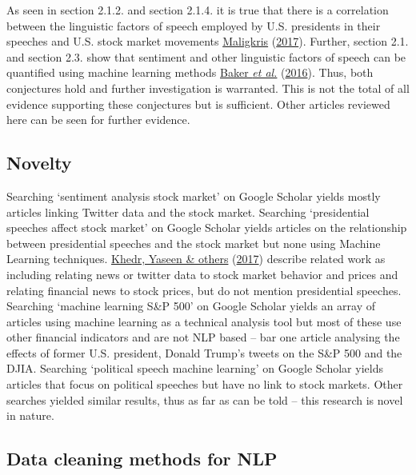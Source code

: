 \documentclass[11pt,preprint, authoryear]{elsarticle}
\numberwithin{equation}{section}
\numberwithin{figure}{section}
\numberwithin{table}{section}
\begin{document}
As seen in section 2.1.2. and section 2.1.4. it is true that there is a
correlation between the linguistic factors of speech employed by U.S.
presidents in their speeches and U.S. stock market movements
\protect\hyperlink{ref-maligkris2017political}{Maligkris}
(\protect\hyperlink{ref-maligkris2017political}{2017}). Further, section
2.1. and section 2.3. show that sentiment and other linguistic factors
of speech can be quantified using machine learning methods
\protect\hyperlink{ref-baker2016measuring}{Baker \emph{et al.}}
(\protect\hyperlink{ref-baker2016measuring}{2016}). Thus, both
conjectures hold and further investigation is warranted. This is not the
total of all evidence supporting these conjectures but is sufficient.
Other articles reviewed here can be seen for further evidence.

\hypertarget{novelty}{%
\subsection{Novelty}\label{novelty}}

Searching `sentiment analysis stock market' on Google Scholar yields
mostly articles linking Twitter data and the stock market. Searching
`presidential speeches affect stock market' on Google Scholar yields
articles on the relationship between presidential speeches and the stock
market but none using Machine Learning techniques.
\protect\hyperlink{ref-khedr2017predicting}{Khedr, Yaseen \& others}
(\protect\hyperlink{ref-khedr2017predicting}{2017}) describe related
work as including relating news or twitter data to stock market behavior
and prices and relating financial news to stock prices, but do not
mention presidential speeches. Searching `machine learning S\&P 500' on
Google Scholar yields an array of articles using machine learning as a
technical analysis tool but most of these use other financial indicators
and are not NLP based -- bar one article analysing the effects of former
U.S. president, Donald Trump's tweets on the S\&P 500 and the DJIA.
Searching `political speech machine learning' on Google Scholar yields
articles that focus on political speeches but have no link to stock
markets. Other searches yielded similar results, thus as far as can be
told -- this research is novel in nature.

\hypertarget{data-cleaning-methods-for-nlp}{%
\subsection{Data cleaning methods for
NLP}\label{data-cleaning-methods-for-nlp}}
\end{document}
